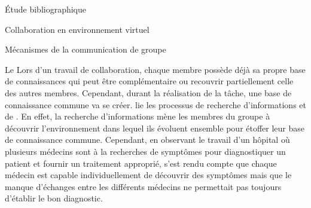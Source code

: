 \documentclass[myfrancais,ngerman,english,frenchb]{mythesis}
\begin{document}
\begin{mychapter}{Étude bibliographique}
\begin{mysection}{Collaboration en environnement virtuel}
\begin{mysubsection}{Mécanismes de la communication de groupe}
\begin{mysubsubsection}{Le \mygrounding}
					Lors d'un travail de collaboration, chaque membre possède déjà sa propre base de connaissances qui peut être complémentaire ou recouvrir partiellement celle des autres membres.
					Cependant, durant la réalisation de la tâche, une base de connaissance commune va se créer.
					 lie les processus de recherche d'informations et de \mygrounding.
					En effet, la recherche d'informations mène les membres du groupe à découvrir l'environnement dans lequel ils évoluent ensemble pour étoffer leur base de connaissance commune.
					Cependant, en observant le travail d'un hôpital où plusieurs médecins sont à la recherches de symptômes pour diagnostiquer un patient et fournir un traitement approprié,  s'est rendu compte que chaque médecin est capable individuellement de découvrir des symptômes mais que le manque d'échanges entre les différents médecins ne permettait pas toujours d'établir le bon diagnostic.


\end{mysubsubsection}
\end{mysubsection}
\end{mysection}
\end{mychapter}
\end{document}
